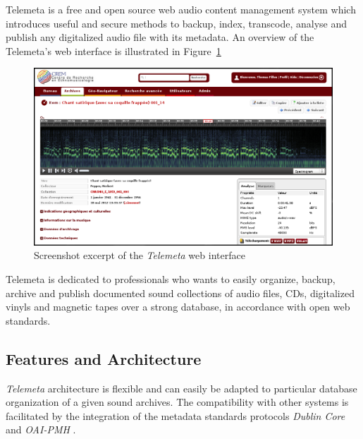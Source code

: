 \documentclass[runningheads,a4paper]{llncs}
\begin{document}
Telemeta is a free and open source web audio content management system which introduces useful and secure methods to backup, index, transcode, analyse and publish any digitalized audio file with its metadata. 
An overview of the Telemeta's web interface is illustrated in Figure~\ref{fig:Telemeta}

\begin{figure}[htbp]
  \centering
  \includegraphics[width=12cm]{img/telemeta.png}
  \caption{Screenshot excerpt of the \emph{Telemeta} web interface}\label{fig:Telemeta}
\end{figure}

Telemeta is dedicated to professionals who wants to easily organize, backup, archive and publish documented sound collections of audio files, CDs, digitalized vinyls and magnetic tapes over a strong database, in accordance with open web standards. 

\subsection{Features and Architecture}

\emph{Telemeta} architecture is flexible and can easily be adapted to particular database organization of a given sound archives. The compatibility with other systems is facilitated by the integration of the metadata standards protocols \emph{Dublin Core} and \emph{OAI-PMH} \cite{DublinCore,OAI-PMH}.

\end{document}
